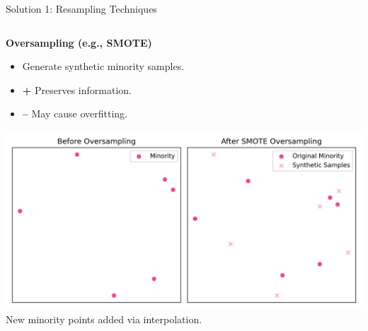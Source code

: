 \documentclass[serif, aspectratio=169]{beamer}
\begin{document}
\begin{frame}{Solution 1: Resampling Techniques}
\begin{columns}[T]
            \begin{column}{0.48\textwidth}
                \textbf{Oversampling (e.g., SMOTE)}
                \begin{itemize}\itemsep0.8em
                \item Generate synthetic minority samples.
                \item \textbf{+} Preserves information.
                \item \textbf{--} May cause overfitting.
                \end{itemize}
                \vspace{0.8em}
                \includegraphics[width=\textwidth]{pic/Figure_34.png}\\
                \scriptsize New minority points added via interpolation.
            \end{column}
        \end{columns}
    \end{frame}
\end{document}
